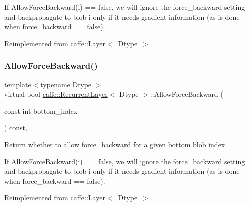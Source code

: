 If Allow\+Force\+Backward(i) == false, we will ignore the force\+\_\+backward setting and backpropagate to blob i only if it needs gradient information (as is done when force\+\_\+backward == false). 

Reimplemented from \mbox{\hyperlink{classcaffe_1_1_layer_a1c0b2bffcd6d57e4bd49f820941badb6}{caffe\+::\+Layer$<$ Dtype $>$}}.

\mbox{\label{classcaffe_1_1_recurrent_layer_a8d91610cc8b9615a1db4f07fe5590a37}} 
\subsubsection{\texorpdfstring{Allow\+Force\+Backward()}{AllowForceBackward()}\hspace{0.1cm}{\footnotesize\ttfamily [2/2]}}
{\footnotesize\ttfamily template$<$typename Dtype $>$ \\
virtual bool \mbox{\hyperlink{classcaffe_1_1_recurrent_layer}{caffe\+::\+Recurrent\+Layer}}$<$ Dtype $>$\+::Allow\+Force\+Backward (\begin{DoxyParamCaption}\item[{const int}]{bottom\+\_\+index }\end{DoxyParamCaption}) const\hspace{0.3cm}{\ttfamily [inline]}, {\ttfamily [virtual]}}



Return whether to allow force\+\_\+backward for a given bottom blob index. 

If Allow\+Force\+Backward(i) == false, we will ignore the force\+\_\+backward setting and backpropagate to blob i only if it needs gradient information (as is done when force\+\_\+backward == false). 

Reimplemented from \mbox{\hyperlink{classcaffe_1_1_layer_a1c0b2bffcd6d57e4bd49f820941badb6}{caffe\+::\+Layer$<$ Dtype $>$}}.

\mbox{\label{classcaffe_1_1_recurrent_layer_a4cb9032f0942c0fef5f6c7094c7b2ab8}} 
